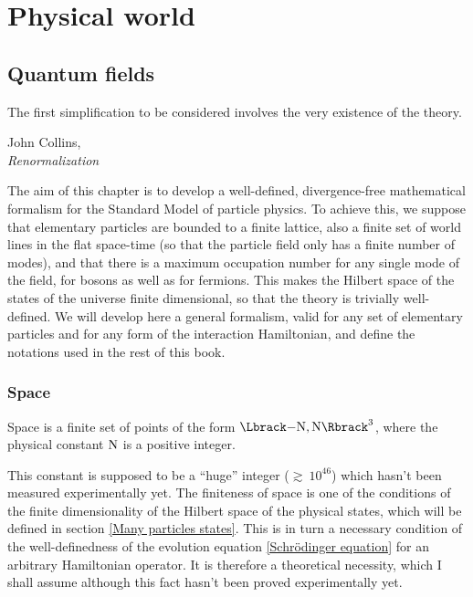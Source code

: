 \documentclass[10pt,a4paper,twoside,openany]{book}
\begin{document}
\mainmatter

\part{Physical world}

\chapter{Quantum fields}
\label{Quantum fields}

\renewcommand{\epigraphwidth}{7cm}
\epigraph{The first simplification to be considered involves the very existence of the theory.}{John Collins,\\\textit{Renormalization}~\cite{Collins1984}}

The aim of this chapter is to develop a well-defined, divergence-free mathematical formalism for the Standard Model of particle physics. To achieve this, we suppose that elementary particles are bounded to a finite lattice, also a finite set of world lines in the flat space-time (so that the particle field only has a finite number of modes), and that there is a maximum occupation number for any single mode of the field, for bosons as well as for fermions. This makes the Hilbert space of the states of the universe finite dimensional, so that the theory is trivially well-defined. We will develop here a general formalism, valid for any set of elementary particles and for any form of the interaction Hamiltonian, and define the notations used in the rest of this book.

\section{Space}

 Space is a finite set of points of the form $\FL$, where the physical constant $\mathrm N$ is a positive integer.

 This constant is supposed to be a ``huge'' integer ($\gtrsim~10^{46}$) which hasn't been measured experimentally yet. The finiteness of space is one of the conditions of the finite dimensionality of the Hilbert space of the physical states, which will be defined in section \ref{Many particles states}. This is in turn a necessary condition of the well-definedness of the evolution equation \ref{Schrödinger equation} for an arbitrary Hamiltonian operator. It is therefore a theoretical necessity, which I shall assume although this fact hasn't been proved experimentally yet.
\end{document}
